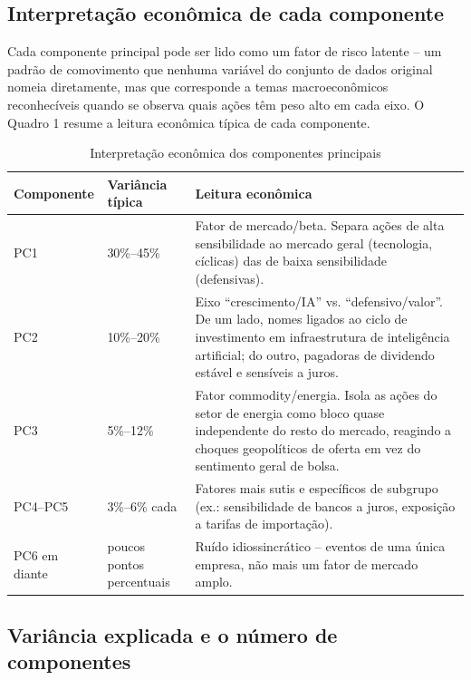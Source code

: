 \documentclass[12pt,oneside,a4paper,brazil,sumario=tradicional]{abntex2}
\begin{document}
\subsection{Interpretação econômica de cada componente}

Cada componente principal pode ser lido como um fator de risco latente -- um
padrão de comovimento que nenhuma variável do conjunto de dados original nomeia
diretamente, mas que corresponde a temas macroeconômicos reconhecíveis quando se
observa quais ações têm peso alto em cada eixo. O Quadro 1 resume a leitura
econômica típica de cada componente.

\begin{table}[htb]
\caption{Interpretação econômica dos componentes principais}
\centering
\begin{tabular}{p{1.7cm}p{2.3cm}p{9.5cm}}
\toprule
\textbf{Componente} & \textbf{Variância típica} & \textbf{Leitura econômica} \\
\midrule
PC1 & 30\%--45\% & Fator de mercado/beta. Separa ações de alta sensibilidade ao
mercado geral (tecnologia, cíclicas) das de baixa sensibilidade (defensivas). \\
PC2 & 10\%--20\% & Eixo ``crescimento/IA'' vs. ``defensivo/valor''. De um lado,
nomes ligados ao ciclo de investimento em infraestrutura de inteligência
artificial; do outro, pagadoras de dividendo estável e sensíveis a juros. \\
PC3 & 5\%--12\% & Fator commodity/energia. Isola as ações do setor de energia
como bloco quase independente do resto do mercado, reagindo a choques
geopolíticos de oferta em vez do sentimento geral de bolsa. \\
PC4--PC5 & 3\%--6\% cada & Fatores mais sutis e específicos de subgrupo (ex.:
sensibilidade de bancos a juros, exposição a tarifas de importação). \\
PC6 em diante & poucos pontos percentuais & Ruído idiossincrático -- eventos de
uma única empresa, não mais um fator de mercado amplo. \\
\bottomrule
\end{tabular}
\vspace{2mm}
\end{table}

\subsection{Variância explicada e o número de componentes}
\end{document}
